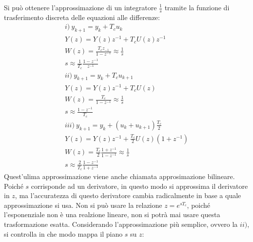 \documentclass{article}
\numberwithin{equation}{subsection}
\begin{document}
Si può ottenere l'approssimazione di un integratore $\displaystyle\frac{1}{s}$ tramite la funzione di trasferimento discreta delle equazioni alle differenze:
\begin{gather}
    i)\:y_{k+1}=y_k+T_cu_k\\
    Y(z)=Y(z)z^{-1}+T_cU(z)z^{-1}\\
    W(z)=\displaystyle\frac{T_cz_{-1}}{1-z^{-1}}\approx\frac{1}{s}\\
    s\approx\displaystyle\frac{1}{T_c}\frac{1-z^{-1}}{z^{-1}}\\
    ii)\:y_{k+1}=y_k+T_cu_{k+1}\\
    Y(z)=Y(z)z^{-1}+T_cU(z)\\
    W(z)=\displaystyle\frac{T_c}{1-z^{-1}}\approx\frac{1}{s}\\
    s\approx\displaystyle\frac{1-z^{-1}}{T_c}\\
    iii)\:y_{k+1}=y_k+(u_k+u_{k+1})\displaystyle\frac{T_c}{2}\\
    Y(z)=Y(z)z^{-1}+\displaystyle\frac{T_c}{2}U(z)(1+z^{-1})\\
    W(z)=\displaystyle\frac{T_c}{2}\frac{1+z^{-1}}{1-z^{-1}}\approx\frac{1}{s}\\
    s\approx\displaystyle\frac{2}{T_c}\frac{1-z^{-1}}{1+z^{-1}}
\end{gather}
Quest'ulima approssimazione viene anche chiamata approsimazione bilineare. Poiché $s$ corrisponde ad un derivatore, in questo modo si approssima il derivatore in $z$, ma 
l'accuratezza di questo derivatore cambia radicalmente in base a quale approssimazione si usa. 
Non si può usare la relazione $z=e^{sT_c}$, poiché l'esponenziale non è una realzione lineare, non si potrà mai usare questa trasformazione esatta. 
Considerando l'approssimazione più semplice, ovvero la $ii)$, si controlla in che modo mappa il piano $s$ su $z$:
\begin{center}
\end{center}
\end{document}
